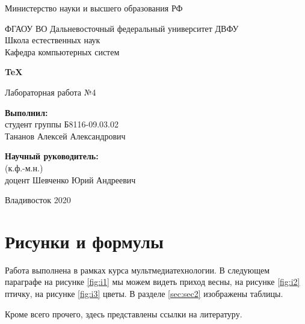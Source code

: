 \documentclass[a4paper,12pt]{article}         %
\begin{document}
\begin{titlepage}
\begin{center}
Министерство науки и высшего образования РФ

ФГАОУ ВО Дальневосточный федеральный университет \flqq ДВФУ\frqq\\

Школа естественных наук\\
Кафедра компьютерных систем\\
\end{center}

\vspace{5cm}

\begin{center}
\LARGE \bf{TeX}
\end{center}

\begin{center}\large
Лабораторная работа №4
\end{center}

\vspace{3cm}

\large
\begin{flushright}
\textbf{Выполнил:}\\
студент группы Б8116-09.03.02\\
Тананов Алексей Александрович\\

\vspace{1cm}

\textbf{Научный руководитель:}\\
(к.ф.-м.н.) \\
доцент Шевченко Юрий Андреевич
\end{flushright}

\vspace{1cm}

\begin{center}
Владивосток 2020
\end{center}
\end{titlepage}

\tableofcontents
\newpage
\section{Рисунки и формулы}
\label{sec:sec1}
Работа выполнена в рамках курса мультмедиатехнологии. В следующем параграфе на рисунке \ref{fig:i1} мы можем видеть приход весны, на рисунке \ref{fig:i2} птичку, на рисунке \ref{fig:i3} цветы. В разделе \ref{sec:sec2} изображены таблицы.

Кроме всего прочего, здесь представлены ссылки на литературу.
\end{document}
